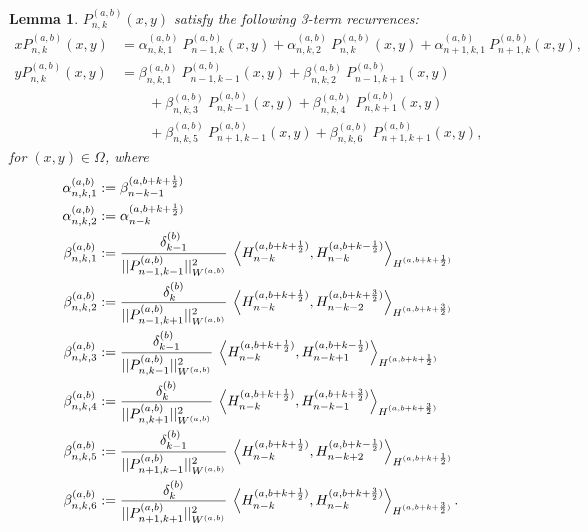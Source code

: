\documentclass[11pt, oneside]{article}   	%
\newcommand{\half}{\frac{1}{2}}
\newcommand{\Pnk}{P_{n,k}}
\newcommand{\alphaab}{\alpha^{(a,b)}}
\newcommand{\betaab}{\beta^{(a,b)}}
\newtheorem{lemma}{Lemma}
\begin{document}
\begin{lemma}
$\Pnk^{(a,b)}(x,y)$ satisfy the following 3-term recurrences:
\begin{align}
x \Pnk^{(a,b)}(x,y) &= \alphaab_{n,k,1} \: P_{n-1, k}^{(a,b)}(x, y) + \alphaab_{n,k,2} \: P_{n, k}^{(a,b)}(x, y) + \alphaab_{n+1,k,1} \: P_{n+1, k}^{(a,b)}(x, y), \\
y \Pnk^{(a,b)}(x,y) &= \betaab_{n,k,1} \: P_{n-1, k-1}^{(a,b)}(x, y) + \betaab_{n,k,2} \: P_{n-1, k+1}^{(a,b)}(x, y) \nonumber \\
		& \quad \quad + \betaab_{n,k,3} \: P_{n, k-1}^{(a,b)}(x, y) + \betaab_{n,k,4} \: P_{n, k+1}^{(a,b)}(x, y) \nonumber \\
		& \quad \quad + \betaab_{n,k,5} \: P_{n+1, k-1}^{(a,b)}(x, y) + \betaab_{n,k,6} \: P_{n+1, k+1}^{(a,b)}(x, y),
\end{align}
for \((x,y) \in \Omega\), where
\begin{align}
\alphaab_{n,k,1} &:= \beta_{n-k-1}^{(a, b+k+\half)} \\
\alphaab_{n,k,2} &:= \alpha_{n-k}^{(a, b+k+\half)} \\
\betaab_{n,k,1} &:= \frac{\delta_{k-1}^{(b)}}{|| P_{n-1,k-1}^{(a,b)} ||_{W^{(a,b)}}^2} \: \ip<H_{n-k}^{(a, b+k+\half)}, H_{n-k}^{(a, b+k-\half)}>_{H^{(a, b+k+\half)}} \\
\betaab_{n,k,2} &:= \frac{\delta_{k}^{(b)}}{|| P_{n-1,k+1}^{(a,b)} ||_{W^{(a,b)}}^2} \: \ip<H_{n-k}^{(a, b+k+\half)}, H_{n-k-2}^{(a, b+k+\frac{3}{2})}>_{H^{(a, b+k+\frac{3}{2})}} \\
\betaab_{n,k,3} &:= \frac{\delta_{k-1}^{(b)}}{|| P_{n,k-1}^{(a,b)} ||_{W^{(a,b)}}^2} \: \ip<H_{n-k}^{(a, b+k+\half)}, H_{n-k+1}^{(a, b+k-\half)}>_{H^{(a, b+k+\half)}} \\
\betaab_{n,k,4} &:= \frac{\delta_{k}^{(b)}}{|| P_{n,k+1}^{(a,b)} ||_{W^{(a,b)}}^2} \: \ip<H_{n-k}^{(a, b+k+\half)}, H_{n-k-1}^{(a, b+k+\frac{3}{2})}>_{H^{(a, b+k+\frac{3}{2})}} \\
\betaab_{n,k,5} &:= \frac{\delta_{k-1}^{(b)}}{|| P_{n+1,k-1}^{(a,b)} ||_{W^{(a,b)}}^2} \: \ip<H_{n-k}^{(a, b+k+\half)}, H_{n-k+2}^{(a, b+k-\half)}>_{H^{(a, b+k+\half)}} \\
\betaab_{n,k,6} &:= \frac{\delta_{k}^{(b)}}{|| P_{n+1,k+1}^{(a,b)} ||_{W^{(a,b)}}^2} \: \ip<H_{n-k}^{(a, b+k+\half)}, H_{n-k}^{(a, b+k+\frac{3}{2})}>_{H^{(a, b+k+\frac{3}{2})}}. 
\end{align}

\end{lemma}
\end{document}
